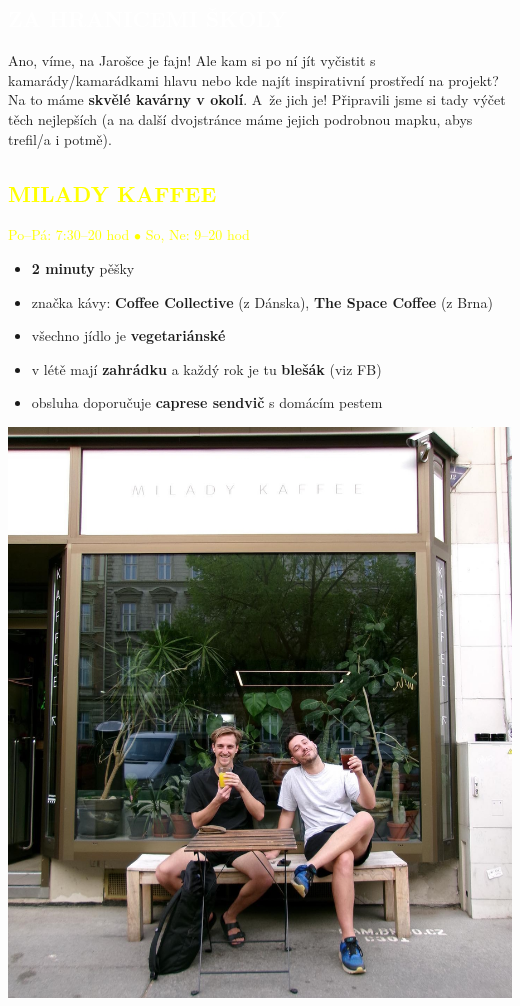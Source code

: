 \documentclass[a5paper, twoside]{article}
\newcommand{\nadpis}[4]{
  \vspace*{-50pt}
  \begin{tcolorbox}[colback = #2, boxrule = 0pt, grow to left by = #4,  grow to right by = #4, arc=8pt, height = 40pt]
    \vspace*{5pt}
    \centering \section*{\textcolor{#3}{#1}}
  \end{tcolorbox}
}
\newcommand{\podnadpis}[2]{
  \subsection*{\textcolor{#2}{#1}}
}
\begin{document}
\nadpis{ZA HRANICEMI ŠKOLY}{yellow}{white}{-2.75cm}

\enlargethispage{\pagegoal}
\noindent \small Ano, víme, na Jarošce je fajn! Ale kam si po ní jít vyčistit s kamarády/kamarádkami hlavu nebo kde najít inspirativní prostředí na projekt? Na to máme \textbf{skvělé kavárny v okolí}. A~že jich je! Připravili jsme si tady výčet těch nejlepších (a na další dvojstránce máme jejich podrobnou mapku, abys trefil/a i potmě).\\

\noindent
\begin{minipage}{0.7\textwidth}
	\podnadpis{MILADY KAFFEE}{yellow}
	\textcolor{yellow}{Po--Pá: 7:30--20 hod $\bullet$ So, Ne: 9--20 hod}
	\vspace{5pt}
	\small
	\begin{itemize}[leftmargin=10pt]
		\item \textbf{2 minuty} pěšky
		\item značka kávy: \textbf{Coffee Collective} (z Dánska), \textbf{The Space Coffee} (z Brna)
		\item všechno jídlo je \textbf{vegetariánské}
		\item v létě mají \textbf{zahrádku} a každý rok je tu \textbf{blešák} (viz FB)
		\item obsluha doporučuje \textbf{caprese sendvič} s domácím pestem
	\end{itemize}
\end{minipage}
\hfill
\begin{minipage}{0.27\textwidth}
	\includegraphics[width=\linewidth]{milady_kaffee.jpg}
\end{minipage}
\\
\end{document}
